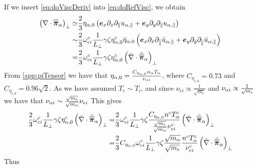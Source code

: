 %
If we insert \cref{eq:doViscDeriv} into \cref{eq:doRefVisc}, we obtain
%
\begin{align*}
 \left(\nabla\cdot\boldsymbol{\overline{\overline{\pi}}}_\alpha\right)_\perp \simeq&
 \frac{2}{3}\eta_{\alpha,0}
 \left(
  \boldsymbol{e}_x\partial_x\partial_\|u_{\alpha,\|}
  +
  \boldsymbol{e}_y\partial_y\partial_\|u_{\alpha,\|}
 \right)
 \\
 \sim&
 \frac{2}{3}
  \omega^c_{ci}
  \frac{1}{L_\perp}
  \gamma
  \zeta
  \eta^c_{\alpha,0}
  \breve{\eta}_{\alpha,0}
 \left(
  \boldsymbol{e}_x\partial_{\breve{x}}\partial_{\breve{\|}}\breve{u}_{\alpha,\|} +
  \boldsymbol{e}_y\partial_{\breve{y}}\partial_{\breve{\|}}\breve{u}_{\alpha,\|}
 \right)
 \\
 =&
 \frac{2}{3}
  \omega^c_{ci}
  \frac{1}{L_\perp}
  \gamma
  \zeta
  \eta^c_{\alpha,0}
 \left(\breve{\nabla}\cdot\breve{\boldsymbol{\overline{\overline{\pi}}}}_\alpha\right)_\perp
\end{align*}
%
From \cref{app:piTensor} we have that $\eta_{\alpha,0}=\frac{C_{\eta_{\alpha,0}}n_\alpha T_\alpha}{\nu_{\alpha i}}$, where $C_{\eta_{e,0}}=0.73$ and $C_{\eta_{i,0}}=0.96\sqrt{2}$.
As we have assumed $T_e \sim T_i$, and since $\nu_{e i}\propto \frac{1}{\sqrt{m_e}}$ and $\nu_{\alpha i}\propto \frac{1}{\sqrt{m_i}}$ we have that $\nu_{\alpha i}\sim \frac{\sqrt{m_e}}{\sqrt{m_\alpha}}\nu_{ei}$
This gives
%
\begin{align*}
 \frac{2}{3}
  \omega^c_{ci}
  \frac{1}{L_\perp}
  \gamma
  \zeta
  \eta^c_{\alpha,0}
 \left(\breve{\nabla}\cdot\breve{\boldsymbol{\overline{\overline{\pi}}}}_\alpha\right)_\perp
 =&
 \frac{2}{3}
  \omega^c_{ci}
  \frac{1}{L_\perp}
  \gamma
  \zeta
  \frac{C_{\eta_{\alpha,0}} n^c T^c_\alpha}{\frac{\sqrt{m_e}}{\sqrt{m_\alpha}}\nu^c_{ei}}
 \left(\breve{\nabla}\cdot\breve{\boldsymbol{\overline{\overline{\pi}}}}_\alpha\right)_\perp
 \\
 =&
 \frac{2}{3}
 C_{\eta_{\alpha,0}}
  \omega^c_{ci}
  \frac{1}{L_\perp}
  \gamma
  \zeta
  \frac{\sqrt{m_\alpha}}{\sqrt{m_e}}
  \frac{n^c T^c_\alpha}{\nu^c_{ei}}
 \left(\breve{\nabla}\cdot\breve{\boldsymbol{\overline{\overline{\pi}}}}_\alpha\right)_\perp
\end{align*}
%
Thus
%
